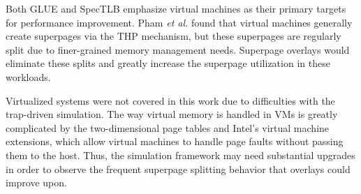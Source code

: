 Both GLUE \cite{Pham} and SpecTLB \cite{Barr} emphasize virtual machines as their primary targets for performance improvement. Pham \emph{et al.} found that virtual machines generally create superpages via the THP mechanism, but these superpages are regularly split due to finer-grained memory management needs. Superpage overlays would eliminate these splits and greatly increase the superpage utilization in these workloads.

Virtualized systems were not covered in this work due to difficulties with the trap-driven simulation. The way virtual memory is handled in VMs is greatly complicated by the two-dimensional page tables and Intel's virtual machine extensions, which allow virtual machines to handle page faults without passing them to the host. Thus, the simulation framework may need substantial upgrades in order to observe the frequent superpage splitting behavior that overlays could improve upon.

